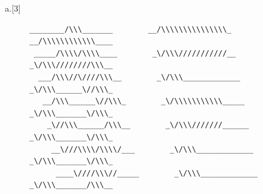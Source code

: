 \begin{question}{a.}[3]
\begin{Questions}
\begin{figure}[H]
\begin{verbatim}
________/\\\_______        __/\\\\\\\\\\\\\\\_        __/\\\\\\\\\\\\____        
 _____/\\\\/\\\\____        _\/\\\///////////__        _\/\\\////////\\\__       
  ___/\\\//\////\\\__        _\/\\\_____________        _\/\\\______\//\\\_      
   __/\\\______\//\\\_        _\/\\\\\\\\\\\_____        _\/\\\_______\/\\\_     
    _\//\\\______/\\\__        _\/\\\///////______        _\/\\\_______\/\\\_    
     __\///\\\\/\\\\/___        _\/\\\_____________        _\/\\\_______\/\\\_   
      ____\////\\\//_____        _\/\\\_____________        _\/\\\_______/\\\__  

\end{verbatim}
\end{figure}
\end{Questions}
\end{question}
